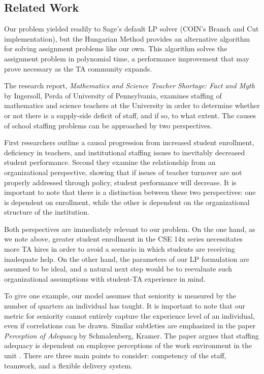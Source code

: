 \documentclass{article}
\begin{document}
\begin{multicols}{2}
\section*{Related Work}

Our problem yielded readily to Sage's default LP solver (COIN's Branch and Cut implementation), but the Hungarian Method provides an alternative algorithm for solving assignment problems like our own. This algorithm solves the assignment problem in polynomial time, a performance improvement that may prove necessary as the TA community expands.

The research report, \textit{Mathematics and Science Teacher Shortage: Fact and Myth} by Ingersoll, Perda of University of Pennsylvania, examines staffing of mathematics and science teachers at the University in order to determine whether or not there is a supply-side deficit of staff, and if so, to what extent\cite{ingersoll}. The causes of school staffing problems can be approached by two perspectives.

First researchers outline a causal progression from increased student enrollment, deficiency in teachers, and institutional staffing issues to inevitably decreased student performance. Second they examine the relationship from an organizational perspective, showing that if issues of teacher turnover are not properly addressed through policy, student performance will decrease. It is important to note that there is a distinction between these two perspectives: one is dependent on enrollment, while the other is dependent on the organizational structure of the institution. 

Both perspectives are immediately relevant to our problem. On the one hand, as we note above, greater student enrollment in the CSE 14x series necessitates more TA hires in order to avoid a scenario in which students are receiving inadequate help. On the other hand, the parameters of our LP formulation are assumed to be ideal, and a natural next step would be to reevaluate such organizational assumptions with student-TA experience in mind.

To give one example, our model assumes that seniority is measured by the number of quarters an individual has taught. It is important to note that our metric for seniority cannot entirely capture the experience level of an individual, even if correlations can be drawn. Similar subtleties are emphasized in the paper \textit{Perception of Adequacy} by Schmalenberg, Kramer. The paper argues that staffing adequacy is dependent on employee perceptions of the work environment in the unit \cite{schmalenberg}. There are three main points to consider: competency of the staff, teamwork, and a flexible delivery system.


\end{multicols}
\end{document}
